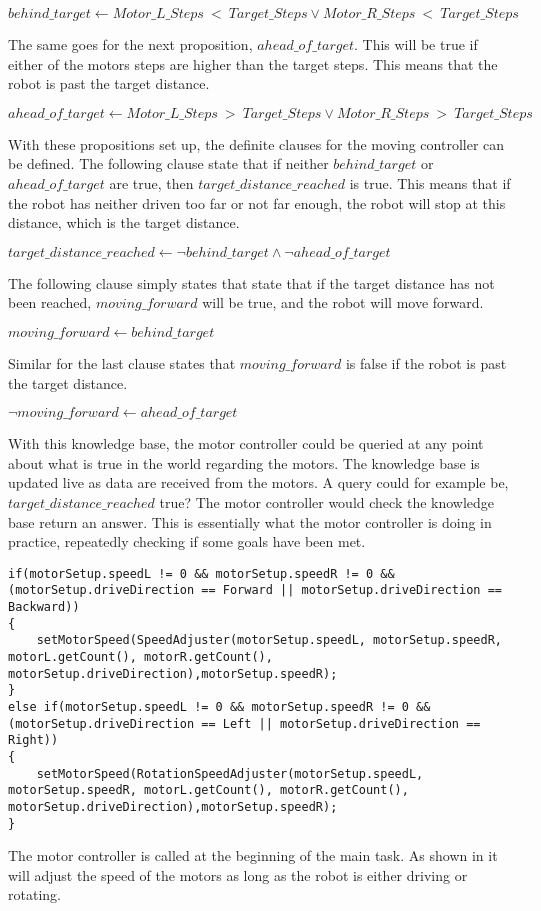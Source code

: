 \hspace{3mm} $behind\_target \leftarrow Motor\_L\_Steps~<~Target\_Steps \lor Motor\_R\_Steps~<~Target\_Steps$

The same goes for the next proposition, $ahead\_of\_target$. This will be true if either of the motors steps are higher than the target steps. This means that the robot is past the target distance.

\hspace{3mm} $ahead\_of\_target \leftarrow Motor\_L\_Steps~>~Target\_Steps \lor Motor\_R\_Steps~>~Target\_Steps$

With these propositions set up, the definite clauses for the moving controller can be defined. The following clause state that if neither $behind\_target$ or $ahead\_of\_target$ are true, then $target\_distance\_reached$ is true. This means that if the robot has neither driven too far or not far enough, the robot will stop at this distance, which is the target distance.

\hspace{3mm} $target\_distance\_reached \leftarrow \lnot behind\_target \land \lnot ahead\_of\_target$

The following clause simply states that state that if the target distance has not been reached, $moving\_forward$ will be true, and the robot will move forward.

\hspace{3mm} $moving\_forward \leftarrow behind\_target$

Similar for the last clause states that $moving\_forward$ is false if the robot is past the target distance.

\hspace{3mm} $\lnot moving\_forward \leftarrow ahead\_of\_target$

With this knowledge base, the motor controller could be queried at any point about what is true in the world regarding the motors. The knowledge base is updated live as data are received from the motors. A query could for example be, $target\_distance\_reached$ true? The motor controller would check the knowledge base return an answer. This is essentially what the motor controller is doing in practice, repeatedly checking if some goals have been met.

\begin{lstlisting}[caption= Calling the motor controller in the main task, label=lst:motor_controller]
if(motorSetup.speedL != 0 && motorSetup.speedR != 0 && (motorSetup.driveDirection == Forward || motorSetup.driveDirection == Backward))
{
	setMotorSpeed(SpeedAdjuster(motorSetup.speedL, motorSetup.speedR, motorL.getCount(), motorR.getCount(), motorSetup.driveDirection),motorSetup.speedR);
}
else if(motorSetup.speedL != 0 && motorSetup.speedR != 0 && (motorSetup.driveDirection == Left || motorSetup.driveDirection == Right))
{
    setMotorSpeed(RotationSpeedAdjuster(motorSetup.speedL, motorSetup.speedR, motorL.getCount(), motorR.getCount(), motorSetup.driveDirection),motorSetup.speedR);
}
\end{lstlisting}

The motor controller is called at the beginning of the main task. As shown in  it will adjust the speed of the motors as long as the robot is either driving or rotating.